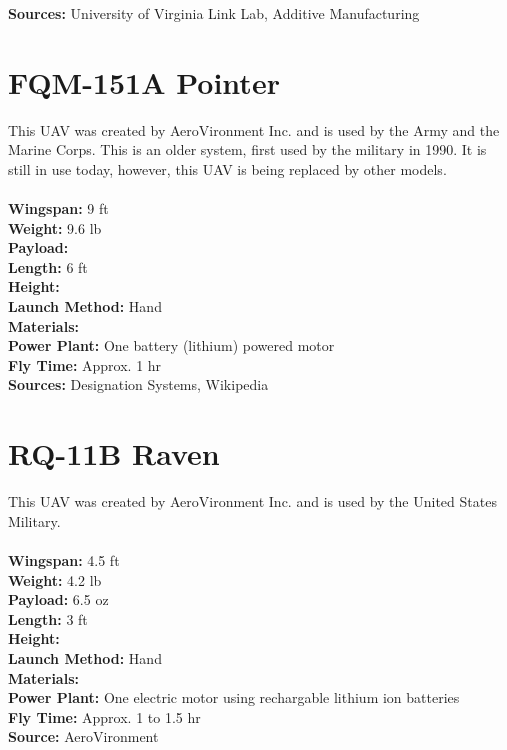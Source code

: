 \documentclass{article}
\begin{document}
\textbf{Sources:} University of Virginia Link Lab, Additive Manufacturing

\section{FQM-151A Pointer}

This UAV was created by AeroVironment Inc. and is used by the Army and the Marine Corps. This is an older system, first used by the military in 1990. It is still in use today, however, this UAV is being replaced by other models.\\\\
\textbf{Wingspan:} 9 ft\\
\textbf{Weight:} 9.6 lb\\
\textbf{Payload:} \\
\textbf{Length:} 6 ft \\
\textbf{Height:}\\
\textbf{Launch Method:} Hand\\
\textbf{Materials:} \\
\textbf{Power Plant:} One battery (lithium) powered motor\\
\textbf{Fly Time:} Approx. 1 hr\\

\textbf{Sources:} Designation Systems, Wikipedia

\section{RQ-11B Raven}

This UAV was created by AeroVironment Inc. and is used by the United States Military.\\\\
\textbf{Wingspan:} 4.5 ft\\
\textbf{Weight:} 4.2 lb\\
\textbf{Payload:} 6.5 oz\\
\textbf{Length:} 3 ft \\
\textbf{Height:}\\
\textbf{Launch Method:} Hand\\
\textbf{Materials:} \\
\textbf{Power Plant:} One electric motor using rechargable lithium ion batteries\\
\textbf{Fly Time:} Approx. 1 to 1.5 hr\\

\textbf{Source:} AeroVironment
\end{document}
